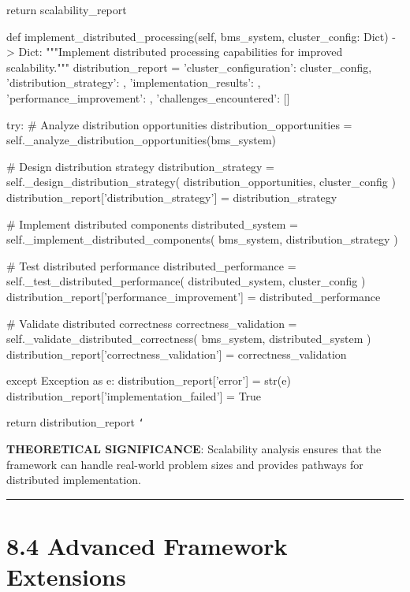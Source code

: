         return scalability_report
        
    def implement_distributed_processing(self, bms_system, cluster_config: Dict) -> Dict:
        """Implement distributed processing capabilities for improved scalability."""
        distribution_report = {
            'cluster_configuration': cluster_config,
            'distribution_strategy': {},
            'implementation_results': {},
            'performance_improvement': {},
            'challenges_encountered': []
        }
        
        try:
            \# Analyze distribution opportunities
            distribution_opportunities = self._analyze_distribution_opportunities(bms_system)
            
            \# Design distribution strategy
            distribution_strategy = self._design_distribution_strategy(
                distribution_opportunities, cluster_config
            )
            distribution_report['distribution_strategy'] = distribution_strategy
            
            \# Implement distributed components
            distributed_system = self._implement_distributed_components(
                bms_system, distribution_strategy
            )
            
            \# Test distributed performance
            distributed_performance = self._test_distributed_performance(
                distributed_system, cluster_config
            )
            distribution_report['performance_improvement'] = distributed_performance
            
            \# Validate distributed correctness
            correctness_validation = self._validate_distributed_correctness(
                bms_system, distributed_system
            )
            distribution_report['correctness_validation'] = correctness_validation
            
        except Exception as e:
            distribution_report['error'] = str(e)
            distribution_report['implementation_failed'] = True
            
        return distribution_report
\texttt{`}

\textbf{THEORETICAL SIGNIFICANCE}: Scalability analysis ensures that the framework can handle real-world problem sizes and provides pathways for distributed implementation.

\hrule

\section{8.4 Advanced Framework Extensions}


